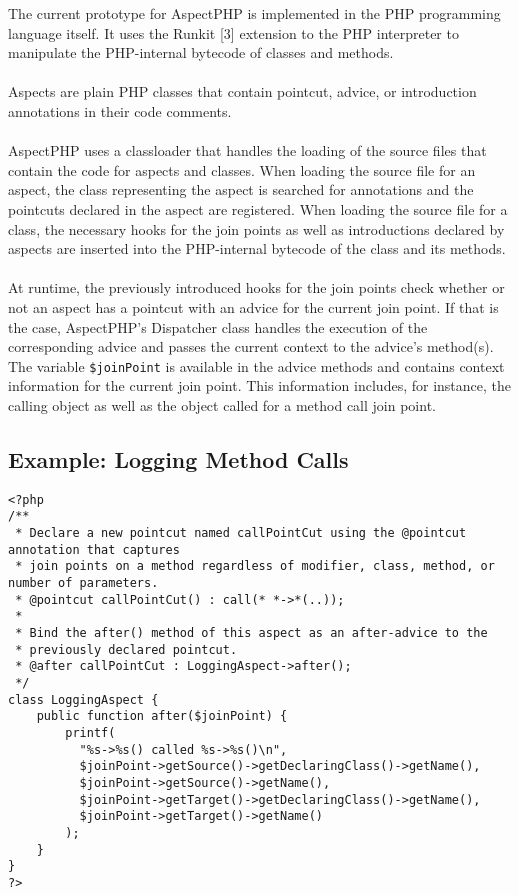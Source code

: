 \documentclass[landscape,a0]{a0poster}
\begin{document}
\begin{poster}
\begin{pcolumn}
\begin{pbox}
      The current prototype for AspectPHP is implemented in the PHP programming
      language itself. It uses the Runkit [3] extension to the PHP interpreter to
      manipulate the PHP-internal bytecode of classes and methods.\\
      \\
      Aspects are plain PHP classes that contain pointcut, advice, or
      introduction annotations in their code comments.\\
      \\
      AspectPHP uses a classloader that handles the loading of the source
      files that contain the code for aspects and classes.
      When loading the source file for an aspect, the class representing the
      aspect is searched for annotations and the pointcuts declared in the
      aspect are registered.
      When loading the source file for a class, the necessary hooks for the
      join points as well as introductions declared by aspects are inserted
      into the PHP-internal bytecode of the class and its methods.\\
      \\
      At runtime, the previously introduced hooks for the join points check
      whether or not an aspect has a pointcut with an advice for the current
      join point. If that is the case, AspectPHP's Dispatcher class handles
      the execution of the corresponding advice and passes the current context
      to the advice's method(s).\\
      The variable \lstinline{$joinPoint} is available in the advice methods and
      contains context information for the current join point. This information
      includes, for instance, the calling object as well as the object called for
      a method call join point.

\end{pbox}

\end{pcolumn}
\begin{pcolumn}

\begin{pbox}
\section{Example: Logging Method Calls}

\begin{lstlisting}
<?php
/**
 * Declare a new pointcut named callPointCut using the @pointcut annotation that captures
 * join points on a method regardless of modifier, class, method, or number of parameters.
 * @pointcut callPointCut() : call(* *->*(..));
 *
 * Bind the after() method of this aspect as an after-advice to the
 * previously declared pointcut.
 * @after callPointCut : LoggingAspect->after();
 */
class LoggingAspect {
    public function after($joinPoint) {
        printf(
          "%s->%s() called %s->%s()\n",
          $joinPoint->getSource()->getDeclaringClass()->getName(),
          $joinPoint->getSource()->getName(),
          $joinPoint->getTarget()->getDeclaringClass()->getName(),
          $joinPoint->getTarget()->getName()
        );
    }
}
?>
\end{lstlisting}


\end{pbox}
\end{pcolumn}
\end{poster}
\end{document}
